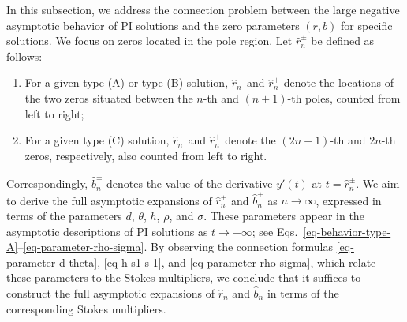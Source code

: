 \documentclass[12pt]{article}
\theoremstyle{plain}
\theoremstyle{definition}
\numberwithin{equation}{section}
\begin{document}
In this subsection, we address the connection problem between the large negative asymptotic behavior of PI solutions and the zero parameters \( (r, b) \) for specific solutions. We focus on zeros located in the pole region. Let \( \hat{r}_{n}^{\pm} \) be defined as follows:
\begin{enumerate}
    \item[(i)] For a given type (A) or type (B) solution, \( \hat{r}_{n}^{-} \) and \( \hat{r}_{n}^{+} \) denote the locations of the two zeros situated between the \( n \)-th and \( (n+1) \)-th poles, counted from left to right;
    \item[(ii)] For a given type (C) solution, \( \hat{r}_{n}^{-} \) and \( \hat{r}_{n}^{+} \) denote the \( (2n - 1) \)-th and \( 2n \)-th zeros, respectively, also counted from left to right.
\end{enumerate}
Correspondingly, \( \hat{b}_{n}^{\pm} \) denotes the value of the derivative \( y'(t) \) at \( t = \hat{r}_{n}^{\pm} \).
We aim to derive the full asymptotic expansions of \( \hat{r}_{n}^{\pm} \) and \( \hat{b}_{n}^{\pm} \) as \( n \to \infty \), expressed in terms of the parameters \( d \), \( \theta \), \( h \), \( \rho \), and \( \sigma \). These parameters appear in the asymptotic descriptions of PI solutions as \( t \to -\infty \); see Eqs.~\eqref{eq-behavior-type-A}--\eqref{eq-parameter-rho-sigma}. By observing the connection formulas \eqref{eq-parameter-d-theta}, \eqref{eq-h-s1-s-1}, and \eqref{eq-parameter-rho-sigma}, which relate these parameters to the Stokes multipliers, we conclude that it suffices to construct the full asymptotic expansions of \( \hat{r}_{n} \) and \( \hat{b}_{n} \) in terms of the corresponding Stokes multipliers.
\end{document}
